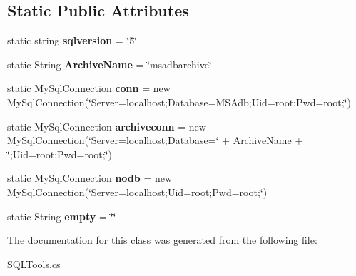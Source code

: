 \subsection*{Static Public Attributes}
\begin{DoxyCompactItemize}
\item 
\mbox{\label{class_m_s_a_m_i_s_user_interface_1_1_s_q_l_tools_abfbacc1533056145a1a45f259d0b72e7}} 
static string {\bfseries sqlversion} = \char`\"{}5\char`\"{}
\item 
\mbox{\label{class_m_s_a_m_i_s_user_interface_1_1_s_q_l_tools_a6178f67d71c5b2822d35572b854a41e8}} 
static String {\bfseries Archive\+Name} = \char`\"{}msadbarchive\char`\"{}
\item 
\mbox{\label{class_m_s_a_m_i_s_user_interface_1_1_s_q_l_tools_a92752b84f66de5c69ae7f0ce3e3d67bd}} 
static My\+Sql\+Connection {\bfseries conn} = new My\+Sql\+Connection(\char`\"{}Server=localhost;Database=M\+S\+Adb;Uid=root;Pwd=root;\char`\"{})
\item 
\mbox{\label{class_m_s_a_m_i_s_user_interface_1_1_s_q_l_tools_ad301b71a7816e84a8ac2fd6411e57398}} 
static My\+Sql\+Connection {\bfseries archiveconn} = new My\+Sql\+Connection(\char`\"{}Server=localhost;Database=\char`\"{} + Archive\+Name + \char`\"{};Uid=root;Pwd=root;\char`\"{})
\item 
\mbox{\label{class_m_s_a_m_i_s_user_interface_1_1_s_q_l_tools_a71a26c8604068ce86164b4ed4efb60f6}} 
static My\+Sql\+Connection {\bfseries nodb} = new My\+Sql\+Connection(\char`\"{}Server=localhost;Uid=root;Pwd=root;\char`\"{})
\item 
\mbox{\label{class_m_s_a_m_i_s_user_interface_1_1_s_q_l_tools_a8a530908da5051e2f86f787c6f10d568}} 
static String {\bfseries empty} = \char`\"{}\char`\"{}
\end{DoxyCompactItemize}


The documentation for this class was generated from the following file\+:\begin{DoxyCompactItemize}
\item 
S\+Q\+L\+Tools.\+cs\end{DoxyCompactItemize}

